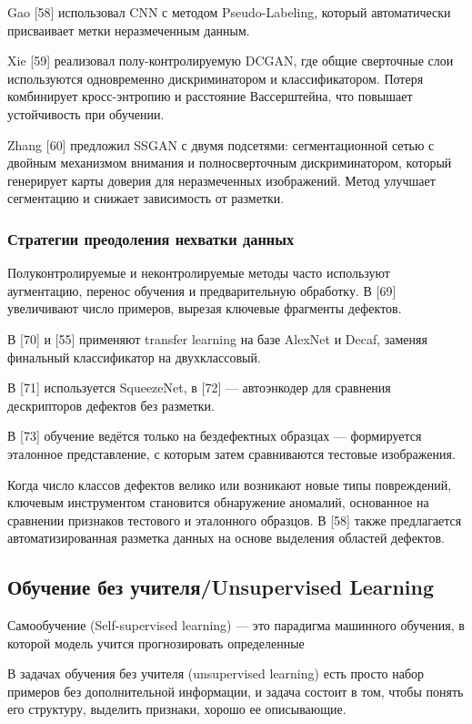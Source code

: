 \documentclass[14pt,a4paper]{article}
\begin{document}
Gao [58] использовал CNN с методом Pseudo-Labeling, который автоматически присваивает метки неразмеченным данным.

Xie [59] реализовал полу-контролируемую DCGAN, где общие сверточные слои используются одновременно дискриминатором и классификатором. Потеря комбинирует кросс-энтропию и расстояние Вассерштейна, что повышает устойчивость при обучении.

Zhang [60] предложил SSGAN с двумя подсетями: сегментационной сетью с двойным механизмом внимания и полносверточным дискриминатором, который генерирует карты доверия для неразмеченных изображений. Метод улучшает сегментацию и снижает зависимость от разметки.

\subsubsection{Стратегии преодоления нехватки данных}
Полуконтролируемые и неконтролируемые методы часто используют аугментацию, перенос обучения и предварительную обработку.
В [69] увеличивают число примеров, вырезая ключевые фрагменты дефектов.

В [70] и [55] применяют transfer learning на базе AlexNet и Decaf, заменяя финальный классификатор на двухклассовый.

В [71] используется SqueezeNet, в [72] — автоэнкодер для сравнения дескрипторов дефектов без разметки.

В [73] обучение ведётся только на бездефектных образцах — формируется эталонное представление, с которым затем сравниваются тестовые изображения.

Когда число классов дефектов велико или возникают новые типы повреждений, ключевым инструментом становится обнаружение аномалий, основанное на сравнении признаков тестового и эталонного образцов. В [58] также предлагается автоматизированная разметка данных на основе выделения областей дефектов.


\subsection{Обучение без учителя/Unsupervised Learning}

Самообучение (Self-supervised learning) — это парадигма машинного обучения, в которой модель учится прогнозировать определенные 

В задачах обучения без учителя (unsupervised learning) есть просто набор примеров без дополнительной информации, и задача состоит в том, чтобы понять его структуру, выделить признаки, хорошо ее описывающие. \cite{Nikolenko2018}
\end{document}
